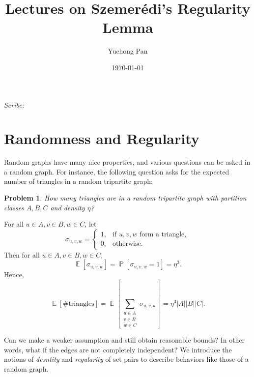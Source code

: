 \documentclass[letterpaper, reqno,11pt]{article}
\newcommand{\PP}{\mathop{{}\mathbb{P}}}
\newcommand{\EE}{\mathop{{}\mathbb{E}}}
\begin{document}
\title{Lectures on Szemer\'edi's Regularity Lemma}
\author{Yuchong Pan}
\date{\today}
\newtheorem{theorem}{Theorem}
\newtheorem{lemma}[theorem]{Lemma}
\newtheorem{proposition}[theorem]{Proposition}
\newtheorem{corollary}[theorem]{Corollary}
\newtheorem{fact}[theorem]{Fact}
\newtheorem{problem}[theorem]{Problem}
\newtheorem{observation}[theorem]{Observation}
\newtheorem{claim}{Claim}
\newtheorem{exercise}{Exercise}
\theoremstyle{definition}
\newtheorem{definition}[theorem]{Definition}
%

\begin{framed}
 \hfill \thedate
\begin{center}
\Large{\thetitle}
\end{center}
 \hfill {\em Scribe: \theauthor}
\end{framed}

\section{Randomness and Regularity}

Random graphs have many nice properties, and various questions can be asked in a random graph. For instance, the following question asks for the expected number of triangles in a random tripartite graph:

\begin{problem}
  How many triangles are in a random tripartite graph with partition classes $A, B, C$ and density $\eta$?
\end{problem}

For all $u \in A, v \in B, w \in C$, let
$$ \sigma_{u, v, w} = \left\{
  \begin{array}{ll}
    1, & \text{if $u, v, w$ form a triangle}, \\
    0, & \text{otherwise}.
  \end{array}
\right. $$
Then for all $u \in A, v \in B, w \in C$,
$$ \EE\left[\sigma_{u, v, w}\right] = \PP\left[\sigma_{u, v, w} = 1\right] = \eta^3. $$
Hence,
$$ \EE[\text{\# triangles}] = \EE\left[\sum_{\substack{u \in A \\ v \in B \\ w \in C}} \sigma_{u, v, w}\right] = \eta^3 |A| |B| |C|. $$

Can we make a weaker assumption and still obtain reasonable bounds? In other words, what if the edges are not completely independent? We introduce the notions of \emph{desntity} and \emph{regularity} of set pairs to describe behaviors like those of a random graph.
\end{document}
